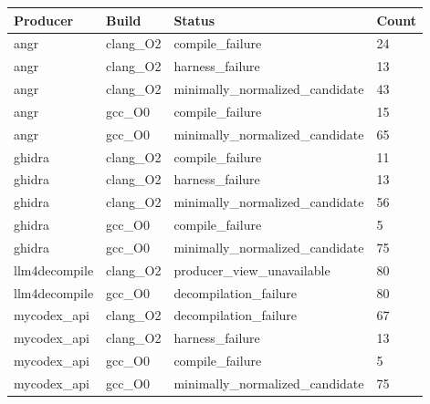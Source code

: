 \begin{tabular}{llll}
\toprule
Producer & Build & Status & Count \\
\midrule
angr & clang\_O2 & compile\_failure & 24 \\
angr & clang\_O2 & harness\_failure & 13 \\
angr & clang\_O2 & minimally\_normalized\_candidate & 43 \\
angr & gcc\_O0 & compile\_failure & 15 \\
angr & gcc\_O0 & minimally\_normalized\_candidate & 65 \\
ghidra & clang\_O2 & compile\_failure & 11 \\
ghidra & clang\_O2 & harness\_failure & 13 \\
ghidra & clang\_O2 & minimally\_normalized\_candidate & 56 \\
ghidra & gcc\_O0 & compile\_failure & 5 \\
ghidra & gcc\_O0 & minimally\_normalized\_candidate & 75 \\
llm4decompile & clang\_O2 & producer\_view\_unavailable & 80 \\
llm4decompile & gcc\_O0 & decompilation\_failure & 80 \\
mycodex\_api & clang\_O2 & decompilation\_failure & 67 \\
mycodex\_api & clang\_O2 & harness\_failure & 13 \\
mycodex\_api & gcc\_O0 & compile\_failure & 5 \\
mycodex\_api & gcc\_O0 & minimally\_normalized\_candidate & 75 \\
\bottomrule
\end{tabular}
